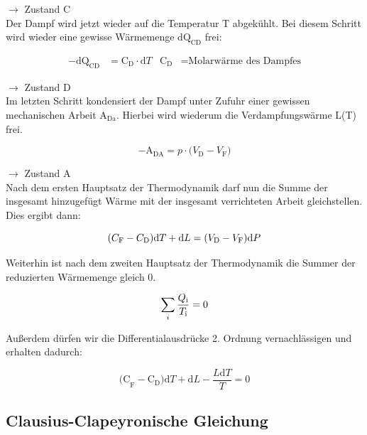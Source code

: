 $\rightarrow$ Zustand C\\
Der Dampf wird jetzt wieder auf die Temperatur T abgekühlt.
Bei diesem Schritt wird wieder eine gewisse Wärmemenge $\text{dQ}_\text{CD}$ frei:

\begin{align}
 -\text{dQ}_\text{CD} &=\text{C}_\text{D}\cdot \text{d}T & \text{C}_\text{D}&=\text{Molarwärme des Dampfes}  \nonumber 
\end{align}

$\rightarrow$ Zustand D\\
Im letzten Schritt kondensiert der Dampf unter Zufuhr einer gewissen mechanischen Arbeit $\text{A}_\text{Da}$.
Hierbei wird wiederum die Verdampfungswärme L(T) frei.

\begin{equation}
    -\text{A}_\text{DA}= p\cdot\text{(}V_\text{D} - V_\text{F}\text{)}  \nonumber
\end{equation}

$\rightarrow$ Zustand A\\


\noindent Nach dem ersten Hauptsatz der Thermodynamik darf nun die Summe der insgesamt hinzugefügt Wärme mit der insgesamt 
verrichteten Arbeit gleichstellen. Dies ergibt dann:    

\begin{equation}
    (C_\text{F}-C_\text{D}\text{)d}T + \text{d}L = \text{(}V_\text{D}-V_\text{F}\text{)d}P\\
    \label{eqn:wearme=Arbeit}
\end{equation}

\noindent Weiterhin ist nach dem zweiten Hauptsatz der Thermodynamik die Summer der reduzierten Wärmemenge gleich 0.

\begin{equation}
    \sum_{i}\frac{Q_\text{i}}{T_\text{i}}=0\nonumber\\
\end{equation}

\noindent Außerdem dürfen wir die Differentialausdrücke 2. Ordnung vernachlässigen und erhalten dadurch:

\begin{equation} 
    \text{(C}_\text{F} - \text{C}_\text{D}\text{)d}T + \text{d}L -\frac{L\text{d}T}{T}= 0
    \label{eqn:Wearme=0}
\end{equation}

\subsection{Clausius-Clapeyronische Gleichung}

